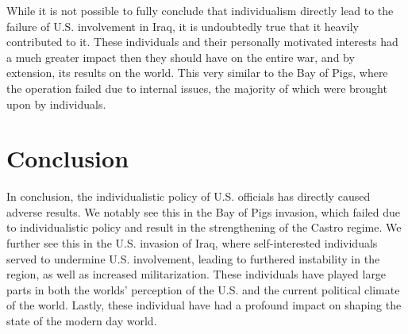 \documentclass[12pt, twoside]{article}
\begin{document}
        While it is not possible to fully conclude that individualism directly lead to the failure of U.S. involvement in Iraq, it is undoubtedly true that it heavily contributed to it. These individuals and their personally motivated interests had a much greater impact then they should have on the entire war, and by extension, its results on the world. This very similar to the Bay of Pigs, where the operation failed due to internal issues, the majority of which were brought upon by individuals.  

\section{Conclusion}
        In conclusion, the individualistic policy of U.S. officials has directly caused adverse results. We notably see this in the Bay of Pigs invasion, which failed due to individualistic policy and result in the strengthening of the Castro regime. We further see this in the U.S. invasion of Iraq, where self-interested individuals served to undermine U.S. involvement, leading to furthered instability in the region, as well as increased militarization. These individuals have played large parts in both the worlds' perception of the U.S. and the current political climate of the world. Lastly, these individual have had a profound impact on shaping the state of the modern day world.

\pagebreak

\printbibliography[heading=bibintoc]
\end{document}
